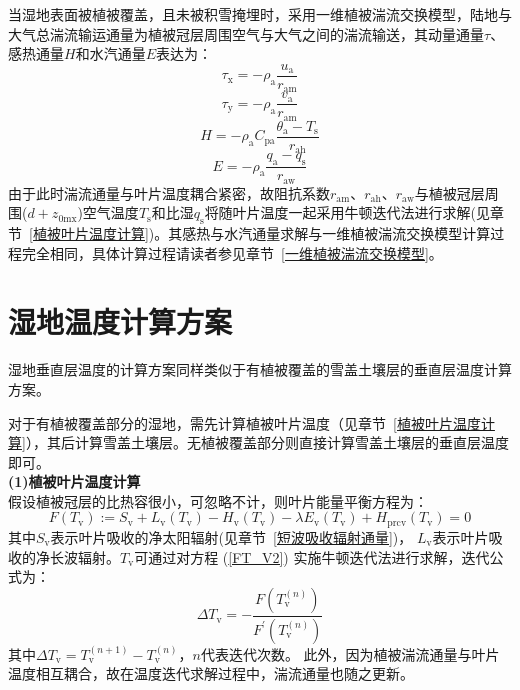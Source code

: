 当湿地表面被植被覆盖，且未被积雪掩埋时，采用一维植被湍流交换模型，陆地与大气总湍流输运通量为植被冠层周围空气与大气之间的湍流输送，其动量通量$\tau$、感热通量$H$和水汽通量$E$表达为：
\begin{equation}
  \tau_{\mathrm{x}}=-\rho_{\mathrm{a}} \frac{u_{\mathrm{a}}}{r_{\mathrm{a m}}}
\end{equation}
\begin{equation}
  \tau_{\mathrm{y}}=-\rho_{\mathrm{a}} \frac{v_{\mathrm{a}}}{r_{\mathrm{a m}}}
\end{equation}
\begin{equation}
  H=-\rho_{\mathrm{a}} C_{\mathrm{p a}} \frac{\theta_{\mathrm{a}}-T_{\mathrm{s}}}{r_{\mathrm{a h}}}
\end{equation}
\begin{equation}
  E=-\rho_{\mathrm{a}} \frac{q_{\mathrm{a}}-q_{\mathrm{s}}}{r_{\mathrm{a w}}}
\end{equation}
由于此时湍流通量与叶片温度耦合紧密，故阻抗系数$r_{\mathrm{am}}$、$r_{\mathrm{ah}}$、$r_{\mathrm{aw}}$与植被冠层周围($d+z_{\mathrm{0mx}}$)空气温度$T_{\mathrm {s}} $和比湿$q_{\mathrm {s}} $将随叶片温度一起采用牛顿迭代法进行求解(见章节~\ref{植被叶片温度计算})。其感热与水汽通量求解与一维植被湍流交换模型计算过程完全相同，具体计算过程请读者参见章节~\ref{一维植被湍流交换模型}。

\section{湿地温度计算方案}
湿地垂直层温度的计算方案同样类似于有植被覆盖的雪盖土壤层的垂直层温度计算方案。

对于有植被覆盖部分的湿地，需先计算植被叶片温度（见章节~\ref{植被叶片温度计算}），其后计算雪盖土壤层。无植被覆盖部分则直接计算雪盖土壤层的垂直层温度即可。\\

\textbf {(1)植被叶片温度计算}\\

假设植被冠层的比热容很小，可忽略不计，则叶片能量平衡方程为：
\begin{equation}\label{FT_V2}
  F\left(T_{\mathrm{v}}\right):=S_{\mathrm{v}}+L_{\mathrm{v}}\left(T_{\mathrm{v}}\right)-H_{\mathrm{v}}\left(T_{\mathrm{v}}\right)-\lambda E_{\mathrm{v}}\left(T_{\mathrm{v}}\right)+H_{\mathrm{p r c v}}\left(T_{\mathrm{v}}\right)=0
\end{equation}
其中$S_{\mathrm {v}} $表示叶片吸收的净太阳辐射(见章节~\ref{短波吸收辐射通量})，
$L_{\mathrm {v}} $表示叶片吸收的净长波辐射。$T_{\mathrm {v}} $可通过对方程 (\ref{FT_V2}) 实施牛顿迭代法进行求解，迭代公式为：
\begin{equation}
  \Delta T_{\mathrm{v}}=-\frac{F\left(T_{\mathrm{v}}^{(n)}\right)}{F^{\prime}\left(T_{\mathrm{v}}^{(n)}\right)}
\end{equation}
其中$\Delta T_{\mathrm {v}} =T_{\mathrm {v}} ^{\left(n+1\right)}-T_{\mathrm {v}} ^{\left(n\right)}$，$n$代表迭代次数。
此外，因为植被湍流通量与叶片温度相互耦合，故在温度迭代求解过程中，湍流通量也随之更新。

